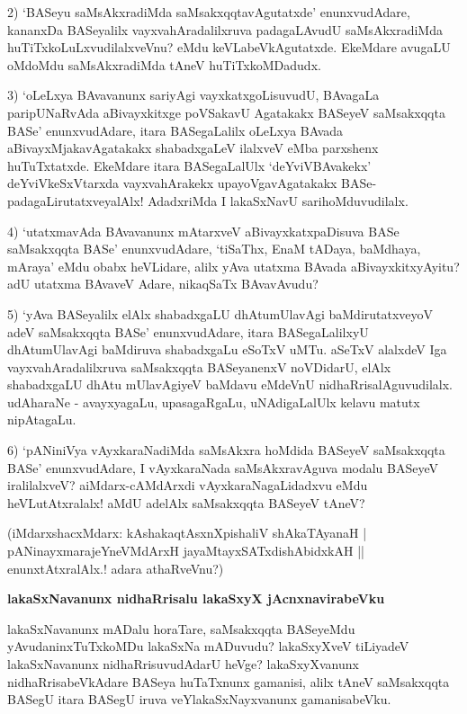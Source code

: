 2) `BASeyu saMsAkxradiMda saMsakxqqtavAgutatxde' enunxvudAdare, kananxDa BASeyalilx vayxvahAradalilxruva padagaLAvudU saMsAkxradiMda huTiTxkoLuLxvudilalxveVnu? eMdu keVLabeVkAgutatxde. EkeMdare avugaLU oMdoMdu saMsAkxradiMda tAneV huTiTxkoMDadudx.

3) `oLeLxya BAvavanunx sariyAgi vayxkatxgoLisuvudU, BAvagaLa paripUNaRvAda aBivayxkitxge poVSakavU Agatakakx BASeyeV saMsakxqqta BASe' enunxvudAdare, itara BASegaLalilx oLeLxya BAvada aBivayxMjakavAgatakakx shabadxgaLeV ilalxveV eMba parxshenx huTuTxtatxde. EkeMdare itara BASegaLalUlx `deYviVBAvakekx' deYviVkeSxVtarxda vayxvahArakekx upayoVgavAgatakakx BASe-padagaLirutatxveyalAlx! AdadxriMda I lakaSxNavU sarihoMduvudilalx.

4) `utatxmavAda BAvavanunx mAtarxveV aBivayxkatxpaDisuva BASe saMsakxqqta BASe' enunxvudAdare, `tiSaThx, EnaM tADaya, baMdhaya, mAraya' eMdu obabx heVLidare, alilx yAva utatxma BAvada aBivayxkitxyAyitu? adU utatxma BAvaveV Adare, nikaqSaTx BAvavAvudu?

5) `yAva BASeyalilx elAlx shabadxgaLU dhAtumUlavAgi baMdirutatxveyoV adeV saMsakxqqta BASe' enunxvudAdare, itara BASegaLalilxyU dhAtumUlavAgi baMdiruva shabadxgaLu eSoTxV uMTu. aSeTxV alalxdeV Iga vayxvahAradalilxruva saMsakxqqta BASeyanenxV noVDidarU, elAlx shabadxgaLU dhAtu mUlavAgiyeV baMdavu eMdeVnU nidhaRrisalAguvudilalx. udAharaNe - avayxyagaLu, upasagaRgaLu, uNAdigaLalUlx kelavu matutx nipAtagaLu.

6) `pANiniVya vAyxkaraNadiMda saMsAkxra hoMdida BASeyeV saMsakxqqta BASe' enunxvudAdare, I vAyxkaraNada saMsAkxravAguva modalu BASeyeV iralilalxveV? aiMdarx-cAMdArxdi vAyxkaraNagaLidadxvu eMdu heVLutAtxralalx! aMdU adelAlx saMsakxqqta BASeyeV tAneV?

\begin{shloka}
(iMdarxshacxMdarx: kAshakaqtAsxnXpishaliV shAkaTAyanaH |\\\label{3}
pANinayxmarajeYneVMdArxH jayaMtayxSATxdishAbidxkAH ||\\
enunxtAtxralAlx.! adara athaRveVnu?)
\end{shloka}

\noindent
\textbf{lakaSxNavanunx nidhaRrisalu lakaSxyX jAcnxnavirabeVku}\label{page3}

lakaSxNavanunx mADalu horaTare, saMsakxqqta BASeyeMdu yAvudaninxTuTxkoMDu lakaSxNa mADuvudu? lakaSxyXveV tiLiyadeV lakaSxNavanunx nidhaRrisuvudAdarU heVge? lakaSxyXvanunx nidhaRrisabeVkAdare BASeya huTaTxnunx gamanisi, alilx tAneV saMsakxqqta BASegU itara BASegU iruva veYlakaSxNayxvanunx gamanisabeVku.


